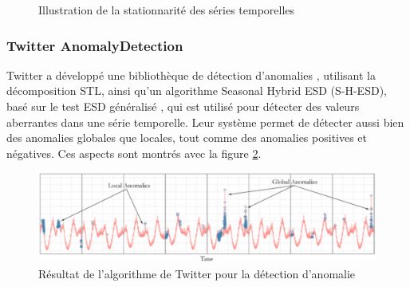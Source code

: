 \documentclass[paper=a4, fontsize=11pt]{scrartcl}
\begin{document}
\begin{figure}[H]
  \centering
  \hfill
  \caption{Illustration de la stationnarité des séries temporelles}
  \label{f-illustrationsStationnarite}
\end{figure}


\subsubsection{Twitter AnomalyDetection}
Twitter a développé une bibliothèque de détection d'anomalies \cite{noauthor_twitteranomalydetection_2020, noauthor_introducing_nodate}, utilisant la décomposition STL, ainsi qu'un algorithme Seasonal Hybrid ESD (S-H-ESD), basé sur le test ESD généralisé \cite{noauthor_135173_nodate}, qui est utilisé pour détecter des valeurs aberrantes dans une série temporelle. \newline
Leur système permet de détecter aussi bien des anomalies globales que locales, tout comme des anomalies positives et négatives. Ces aspects sont montrés avec la figure \ref{f-TwitterAD}.

\begin{figure}[H]
    \centering
    \includegraphics[width=18cm]{img/TwitterAD.png}
    \caption{Résultat de l'algorithme de Twitter pour la détection d'anomalie \cite{noauthor_introducing_nodate}}
    \label{f-TwitterAD}
\end{figure}
\end{document}
